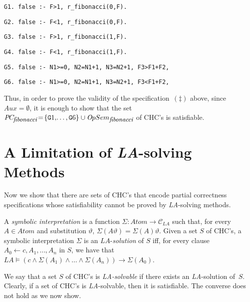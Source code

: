 \documentclass[english]{tlp}
\begin{document}
{\small
\smallskip
\noindent
{\tt{G1. false :- F>1, r\_fibonacci(0,F).}}\nopagebreak
\hspace{10mm}

\noindent
{\tt{G2. false :- F<1, r\_fibonacci(0,F).}}\nopagebreak

\noindent
{\tt{G3. false :- F>1, r\_fibonacci(1,F).}}\nopagebreak
\hspace{10mm}

\noindent
{\tt{G4. false :- F<1, r\_fibonacci(1,F).}}

\noindent
{\tt{G5. false :- N1>=0, N2=N1+1, N3=N2+1, F3>F1+F2,}}\nopagebreak 

         
\noindent  
{\tt{G6. false :- N1>=0, N2=N1+1, N3=N2+1, F3<F1+F2,}}\nopagebreak


} 

\noindent
Thus, in order to prove 
the validity of the specification~$(\ddagger)$ above, 
since $\textit{Aux}\!=\!\emptyset$,
it is enough to show that the set
${\textit PC\!}_{\textit{\small fibonacci}}\!=\!
\{{\texttt G1},\!\ldots,{\texttt G6}\}\/ \cup 
{\textit OpSem}_{\textit{\small fibonacci}}$ of CHC's  
is satisfiable.

\section{A Limitation of {\textit{LA}}-solving Methods}
\label{sec:Limitations}

Now we show that there are sets of CHC's that encode
partial correctness specifications whose 
satisfiability cannot be proved by {\textit {LA}}-solving methods.

A {\it symbolic interpretation} is a function $\Sigma \!: \textit{Atom} 
\longrightarrow \! \mathcal C_{{LA}}$ such that, for every $A\! \in\!
 \textit{Atom}$ and substitution $\vartheta$, 
$\Sigma(A\vartheta) = \Sigma(A)\vartheta$.
Given a set $S$ of CHC's, a symbolic interpretation $\Sigma$ is an 
${\textit{LA}}$-{\it solution}
of $S$ iff, for every clause $A_0 \leftarrow c, A_1,\ldots,A_n$ in $S$, 
we have that
${\textit{LA}} \models (c \wedge \Sigma(A_1) \wedge \ldots \wedge  
\Sigma(A_n))\rightarrow   \Sigma(A_0)$.

We say that a set $S$ of CHC's is {\textit {LA-solvable}} 
if there exists an {\textit {LA}}-solution of~$S$.
Clearly, if a  set of CHC's is {\textit {LA}}-solvable, then it is satisfiable.
The converse does not hold as we now show.
\end{document}
